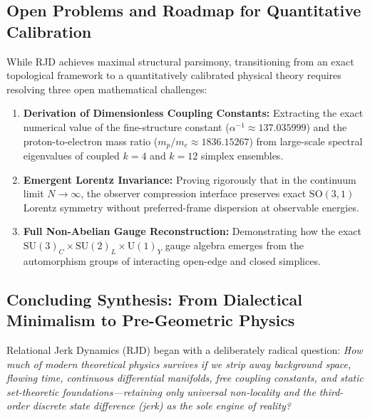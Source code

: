 \documentclass[11pt,a4paper]{article}
\theoremstyle{plain}
\theoremstyle{definition}
\theoremstyle{remark}
\begin{document}
\subsection{Open Problems and Roadmap for Quantitative Calibration}
While RJD achieves maximal structural parsimony, transitioning from an exact topological framework to a quantitatively calibrated physical theory requires resolving three open mathematical challenges:
\begin{enumerate}
\item \textbf{Derivation of Dimensionless Coupling Constants:} Extracting the exact numerical value of the fine-structure constant ($\alpha^{-1} \approx 137.035999$) and the proton-to-electron mass ratio ($m_p / m_e \approx 1836.15267$) from large-scale spectral eigenvalues of coupled $k=4$ and $k=12$ simplex ensembles.
\item \textbf{Emergent Lorentz Invariance:} Proving rigorously that in the continuum limit $N \to \infty$, the observer compression interface preserves exact $\mathrm{SO}(3,1)$ Lorentz symmetry without preferred-frame dispersion at observable energies.
\item \textbf{Full Non-Abelian Gauge Reconstruction:} Demonstrating how the exact $\mathrm{SU}(3)_C \times \mathrm{SU}(2)_L \times \mathrm{U}(1)_Y$ gauge algebra emerges from the automorphism groups of interacting open-edge and closed simplices.
\end{enumerate}
\subsection{Concluding Synthesis: From Dialectical Minimalism to Pre-Geometric Physics}
\label{sec:conclusion}

Relational Jerk Dynamics (RJD) began with a deliberately radical question: \emph{How much of modern theoretical physics survives if we strip away background space, flowing time, continuous differential manifolds, free coupling constants, and static set-theoretic foundations—retaining only universal non-locality and the third-order discrete state difference (jerk) as the sole engine of reality?}
\end{document}
